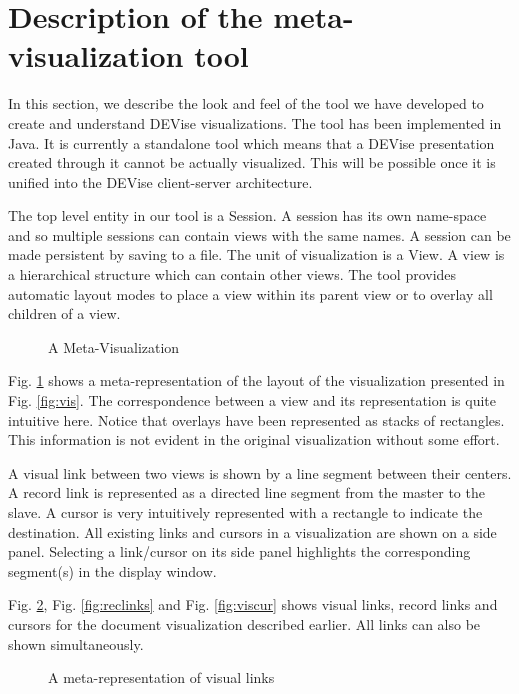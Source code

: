 \section{Description of the meta-visualization tool}
\label{sec:impl}

In this section, we describe the look and feel of the tool we have
developed to create and understand DEVise visualizations. The
tool has been implemented in Java. It is currently a standalone tool
which means that a DEVise presentation created through it cannot be actually 
visualized. This will be possible once it is unified into the DEVise 
client-server architecture.

The top level entity in our tool is a Session. A session
has its own name-space and so multiple sessions can contain views with
the same names. A session can be made persistent by saving to a file.
The unit of visualization is a View. A view is a hierarchical structure
which can contain other views. The tool provides automatic layout
modes to place a view within its parent view or to overlay all children
of a view. 

\begin{figure}[tbp]
\centerline{}
\caption{\label{fig:vislayout}{A Meta-Visualization}}
\end{figure}

Fig. \ref{fig:vislayout} shows a meta-representation of the layout 
of the visualization presented in Fig. \ref{fig:vis}. The correspondence
between a view and its representation is quite intuitive here. Notice
that overlays have been represented as stacks of rectangles. This
information is not evident in the original visualization without some
effort.

A visual link between two views is shown by a line segment between
their centers. 
A record link is represented as a directed line segment from
the master to the slave. A cursor is very intuitively represented with
a rectangle to indicate the destination. All existing links and cursors
in a visualization are shown on a side panel. Selecting a link/cursor on
its side panel highlights the corresponding segment(s) in the display window. 

Fig. \ref{fig:vislinks}, Fig. \ref{fig:reclinks} and Fig. \ref{fig:viscur}
shows visual links, record links and cursors for the document visualization
described earlier. All links can also be shown simultaneously.

\begin{figure}[tbp]
\centerline{}
\caption{\label{fig:vislinks}{A meta-representation of visual links}}
\end{figure}

